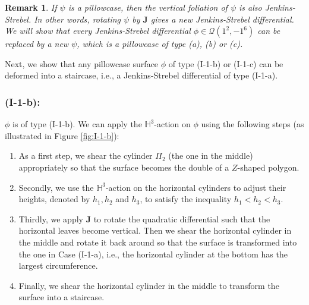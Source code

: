 \documentclass[11pt]{amsart}
\theoremstyle{plain}
\newtheorem{Remark}{Remark}
\newcommand{\HP}{\mathbb{H}}
\newcommand{\Q}{\mathcal{Q}}
\newcommand{\rot}{\mathbf{J}}
\begin{document}
\begin{Remark}
If $\psi$ is a pillowcase,
then the vertical foliation of $\psi$ is also Jenkins-Strebel. In other words,
  rotating $\psi$ by $\rot$ gives a new Jenkins-Strebel differential. We will show that every Jenkins-Strebel differential $\phi\in \Q(1^2, -1^6)$ can be replaced by a new $\psi$, which is a pillowcase of type (a), (b) or (c).
\end{Remark}

Next, we show that any pillowcase surface $\phi$ of type (I-1-b) or (I-1-c) can be deformed into a staircase, i.e., a Jenkins-Strebel differential of type (I-1-a). 


\subsubsection*{\textbf{(I-1-b):}} $\phi$ is of type (I-1-b). 
We can apply the $\HP^3$-action on $\phi$ using the following steps 
(as illustrated in Figure \ref{fig:I-1-b}): 



\begin{enumerate}
  \item[(i)] As a first step, we shear the cylinder $\Pi_2$ (the one in the middle)  appropriately so that the surface becomes the double of a $Z$-shaped polygon.
  \item[(ii)] Secondly, we use the $\HP^3$-action on the horizontal cylinders to adjust their heights, denoted by $h_1,h_2$ and $h_3$, to satisfy the inequality $h_1<h_2<h_3$.
      \item[(iii)] Thirdly, we apply $\rot$ to rotate the quadratic differential such that the horizontal leaves become vertical.  Then we shear the horizontal cylinder in the middle and rotate it back around so that the surface is transformed into the one in Case (I-1-a), i.e., the horizontal cylinder at the bottom has the largest circumference. 
\item[(iv)] Finally, we  
shear the horizontal cylinder in the middle  to transform the surface into a staircase.
\end{enumerate} 
\end{document}
